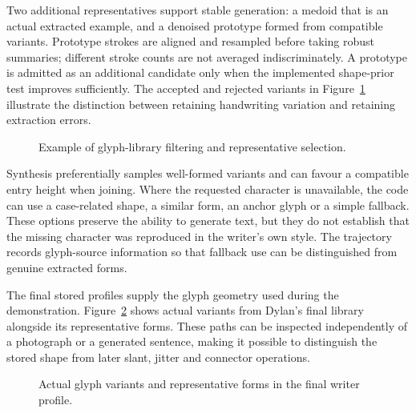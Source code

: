 Two additional representatives support stable generation: a medoid that is an actual extracted example, and a denoised prototype formed from compatible variants. Prototype strokes are aligned and resampled before taking robust summaries; different stroke counts are not averaged indiscriminately. A prototype is admitted as an additional candidate only when the implemented shape-prior test improves sufficiently. The accepted and rejected variants in Figure~\ref{fig:des-glyphquality} illustrate the distinction between retaining handwriting variation and retaining extraction errors.~\cite[style.py; synthesise.py]{braunepipeline2026}


\begin{figure}[!htbp]\centering
{}
\caption{Example of glyph-library filtering and representative selection.~\cite{brauneevidence2026,braunepipeline2026}}
\label{fig:des-glyphquality}
\end{figure}

Synthesis preferentially samples well-formed variants and can favour a compatible entry height when joining. Where the requested character is unavailable, the code can use a case-related shape, a similar form, an anchor glyph or a simple fallback. These options preserve the ability to generate text, but they do not establish that the missing character was reproduced in the writer's own style. The trajectory records glyph-source information so that fallback use can be distinguished from genuine extracted forms.~\cite[style.py; synthesise.py; reproduce.py]{braunepipeline2026}

The final stored profiles supply the glyph geometry used during the demonstration. Figure~\ref{fig:des-profile-example} shows actual variants from Dylan's final library alongside its representative forms. These paths can be inspected independently of a photograph or a generated sentence, making it possible to distinguish the stored shape from later slant, jitter and connector operations.~\cite[style.py; synthesise.py]{braunepipeline2026}


\begin{figure}[!htbp]\centering
{}
\caption{Actual glyph variants and representative forms in the final writer profile.~\cite{brauneevidence2026,braunepipeline2026}}
\label{fig:des-profile-example}
\end{figure}


